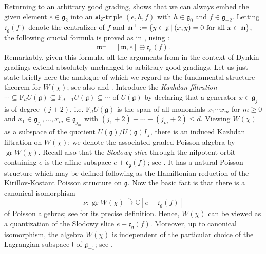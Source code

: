 \documentclass[twoside,12pt,reqno]{amsart}
\def\C{{\mathbb C}}
\def\F{\mathrm{F}}
\def\gr{\operatorname{gr}}
\def\elly{\mathfrak{l}}
\begin{document}
Returning to an arbitrary good grading, \cite[Lemma 1.1]{EK} 
shows that we can always embed the given element
$e \in \mathfrak{g}_2$ into 
an $\mathfrak{sl}_2$-triple
$(e,h,f)$ with 
$h \in \mathfrak{g}_0$ and $f \in \mathfrak{g}_{-2}$. 
Letting 
$\mathfrak{c}_{\mathfrak{g}}(f)$
denote the centralizer of $f$ and 
$\mathfrak{m}^\perp
:= \{y \in \mathfrak{g}\:|\:(x,y)=0 \hbox{ for all }x \in \mathfrak{m}\}$, 
the following 
crucial formula is proved as in \cite[$\S$2.3]{GG}, using
\cite[Theorem 1.4]{EK}:
\begin{equation*}
\mathfrak{m}^\perp = [\mathfrak{m}, e] \oplus \mathfrak{c}_{\mathfrak{g}}(f).
\end{equation*}
Remarkably, given this formula, all the arguments 
from \cite{GG} in the context of Dynkin gradings
extend absolutely unchanged to arbitrary good gradings.
Let us just state briefly here the analogue of \cite[Proposition 6.3]{P}
which we regard as the fundamental structure
theorem for $W(\chi)$; see also 
\cite[Theorem 4.1]{GG} and
\cite[Theorem 2.3]{Ly}.
Introduce the {\em Kazhdan filtration}
$\cdots \subseteq 
\F_d U(\mathfrak{g}) \subseteq \F_{d+1} U(\mathfrak{g}) \subseteq 
\cdots$ of $U(\mathfrak{g})$
by declaring that a generator $x \in \mathfrak{g}_j$ is of degree 
$(j+2)$, i.e. $\F_d U(\mathfrak{g})$ is the span of all
monomials $x_1 \cdots x_m$ for $m \geq 0$ and
$x_1 \in \mathfrak{g}_{j_1}, \dots, x_m \in \mathfrak{g}_{j_m}$
with $(j_1+2)+\cdots+(j_m+2) \leq d$. 
Viewing $W(\chi)$ as a subspace of the quotient
$U(\mathfrak{g}) / U(\mathfrak{g}) I_\chi$,
there is an induced Kazhdan filtration on $W(\chi)$;
we denote the associated graded Poisson algebra by $\gr W(\chi)$.
Recall also that the {\em Slodowy slice} through the nilpotent orbit
containing $e$ is the affine subspace $e + \mathfrak{c}_{\mathfrak{g}}(f)$;
see \cite{Slod}. 
It has a natural Poisson structure which may be defined
following \cite[$\S$3.2]{GG} 
as the Hamiltonian reduction of the Kirillov-Kostant 
Poisson structure on $\mathfrak{g}$. 
Now the basic fact is that there is a canonical
isomorphism \begin{equation*}
\nu:\gr W(\chi) 
\stackrel{\sim}{\rightarrow} \C[e+\mathfrak{c}_{\mathfrak{g}}(f)]
\end{equation*} 
of Poisson algebras; see \cite[$\S$4.4]{GG} for its precise definition.
Hence, $W(\chi)$ can be viewed as a quantization of the Slodowy slice
$e + \mathfrak{c}_{\mathfrak{g}}(f)$.
Moreover, up to canonical
isomorphism, the algebra $W(\chi)$ is independent of the
particular choice of the Lagrangian subspace $\elly$ of $\mathfrak{g}_{-1}$;
see \cite[$\S$5.5]{GG}.
\end{document}
